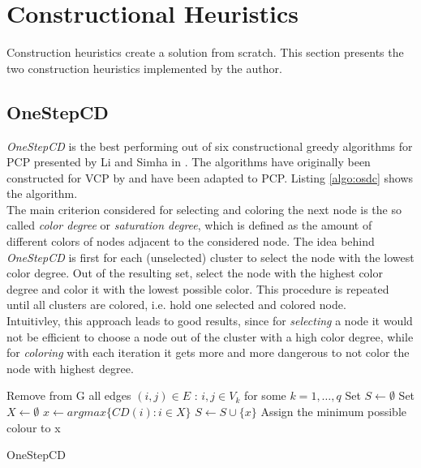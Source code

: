 \clearpage

\section{Constructional Heuristics}
\label{sec:construction}

Construction heuristics create a solution from scratch. This section presents the two construction heuristics implemented by the author.

\subsection{OneStepCD}

\textit{OneStepCD} is the best performing out of six constructional greedy algorithms for PCP presented by Li and Simha in \cite{li-00}. The algorithms have originally been constructed for VCP by \cite{brelaz-79} and have been adapted to PCP. Listing \ref{algo:osdc} shows the algorithm.\\
The main criterion considered for selecting and coloring the next node is the so called \textit{color degree} or \textit{saturation degree}, which is defined as the amount of different colors of nodes adjacent to the considered node. The idea behind \textit{OneStepCD} is first for each (unselected) cluster to select the node with the lowest color degree. Out of the resulting set, select the node with the highest color degree and color it with the lowest possible color. This procedure is repeated until all clusters are colored, i.e. hold one selected and colored node.\\
Intuitivley, this approach leads to good results, since for \textit{selecting} a node it would not be efficient to choose a node out of the cluster with a high color degree, while for \textit{coloring} with each iteration it gets more and more dangerous to not color the node with highest degree.

\begin{algorithm}[h]
Remove from G all edges $(i,j) \in E$ : $i,j \in V_k$ for some $k=1,\ldots,q$\; 
Set $S \gets \emptyset $\;
 {
  Set $X \gets \emptyset $\;
  $x \gets argmax\{CD(i) : i \in X \}$\;
  $S \gets S \cup \{x\}$\;
  Assign the minimum possible colour to x\;
}
\;
\caption{OneStepCD}
\label{algo:osdc}
\end{algorithm}


